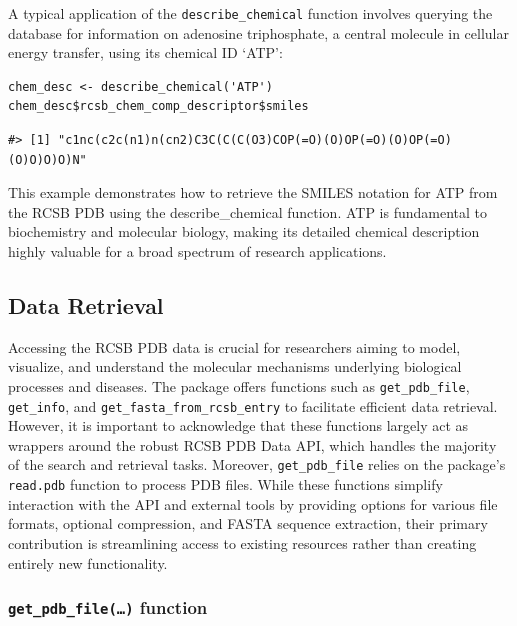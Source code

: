 A typical application of the \texttt{describe\_chemical} function involves querying the database for information on adenosine triphosphate, a central molecule in cellular energy transfer, using its chemical ID `ATP':

\begin{verbatim}
chem_desc <- describe_chemical('ATP')
chem_desc$rcsb_chem_comp_descriptor$smiles
\end{verbatim}

\begin{verbatim}
#> [1] "c1nc(c2c(n1)n(cn2)C3C(C(C(O3)COP(=O)(O)OP(=O)(O)OP(=O)(O)O)O)O)N"
\end{verbatim}

This example demonstrates how to retrieve the SMILES notation for ATP from the RCSB PDB using the describe\_chemical function. ATP is fundamental to biochemistry and molecular biology, making its detailed chemical description highly valuable for a broad spectrum of research applications.

\subsection{Data Retrieval}\label{data-retrieval}

Accessing the RCSB PDB data is crucial for researchers aiming to model, visualize, and understand the molecular mechanisms underlying biological processes and diseases. The  package offers functions such as \texttt{get\_pdb\_file}, \texttt{get\_info}, and \texttt{get\_fasta\_from\_rcsb\_entry} to facilitate efficient data retrieval. However, it is important to acknowledge that these functions largely act as wrappers around the robust RCSB PDB Data API, which handles the majority of the search and retrieval tasks. Moreover, \texttt{get\_pdb\_file} relies on the  package's \texttt{read.pdb} function to process PDB files. While these functions simplify interaction with the API and external tools by providing options for various file formats, optional compression, and FASTA sequence extraction, their primary contribution is streamlining access to existing resources rather than creating entirely new functionality.

\subsubsection{\texorpdfstring{\texttt{get\_pdb\_file(…)} function}{get\_pdb\_file(\ldots) function}}\label{get_pdb_file-function}

